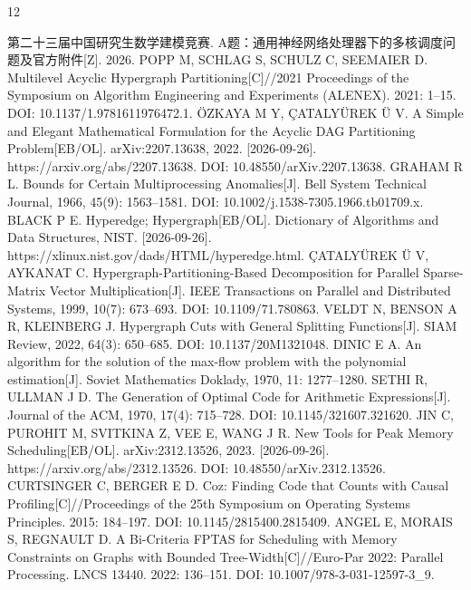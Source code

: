 \documentclass[anonymous,notoc]{gmcm2026}
\begin{document}
\FloatBarrier
\begin{thebibliography}{12}
\raggedright
{} 第二十三届中国研究生数学建模竞赛. A题：通用神经网络处理器下的多核调度问题及官方附件{[}Z{]}. 2026.
 POPP M, SCHLAG S, SCHULZ C, SEEMAIER D. Multilevel Acyclic Hypergraph Partitioning{[}C{]}//2021 Proceedings of the Symposium on Algorithm Engineering and Experiments (ALENEX). 2021: 1--15. DOI: 10.1137/1.9781611976472.1.
 ÖZKAYA M Y, ÇATALYÜREK Ü V. A Simple and Elegant Mathematical Formulation for the Acyclic DAG Partitioning Problem{[}EB/OL{]}. arXiv:2207.13638, 2022. {[}2026-09-26{]}. https://arxiv.org/abs/2207.13638. DOI: 10.48550/arXiv.2207.13638.
 GRAHAM R L. Bounds for Certain Multiprocessing Anomalies{[}J{]}. Bell System Technical Journal, 1966, 45(9): 1563--1581. DOI: 10.1002/j.1538-7305.1966.tb01709.x.
 BLACK P E. Hyperedge; Hypergraph{[}EB/OL{]}. Dictionary of Algorithms and Data Structures, NIST. {[}2026-09-26{]}. https://xlinux.nist.gov/dads/HTML/hyperedge.html.
 ÇATALYÜREK Ü V, AYKANAT C. Hypergraph-Partitioning-Based Decomposition for Parallel Sparse-Matrix Vector Multiplication{[}J{]}. IEEE Transactions on Parallel and Distributed Systems, 1999, 10(7): 673--693. DOI: 10.1109/71.780863.
 VELDT N, BENSON A R, KLEINBERG J. Hypergraph Cuts with General Splitting Functions{[}J{]}. SIAM Review, 2022, 64(3): 650--685. DOI: 10.1137/20M1321048.
 DINIC E A. An algorithm for the solution of the max-flow problem with the polynomial estimation{[}J{]}. Soviet Mathematics Doklady, 1970, 11: 1277--1280.
 SETHI R, ULLMAN J D. The Generation of Optimal Code for Arithmetic Expressions{[}J{]}. Journal of the ACM, 1970, 17(4): 715--728. DOI: 10.1145/321607.321620.
 JIN C, PUROHIT M, SVITKINA Z, VEE E, WANG J R. New Tools for Peak Memory Scheduling{[}EB/OL{]}. arXiv:2312.13526, 2023. {[}2026-09-26{]}. https://arxiv.org/abs/2312.13526. DOI: 10.48550/arXiv.2312.13526.
 CURTSINGER C, BERGER E D. Coz: Finding Code that Counts with Causal Profiling{[}C{]}//Proceedings of the 25th Symposium on Operating Systems Principles. 2015: 184--197. DOI: 10.1145/2815400.2815409.
 ANGEL E, MORAIS S, REGNAULT D. A Bi-Criteria FPTAS for Scheduling with Memory Constraints on Graphs with Bounded Tree-Width{[}C{]}//Euro-Par 2022: Parallel Processing. LNCS 13440. 2022: 136--151. DOI: 10.1007/978-3-031-12597-3\_9.
\end{thebibliography}

\appendix
\end{document}
